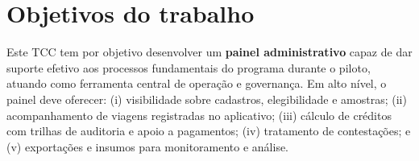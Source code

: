 
\section{Objetivos do trabalho}
Este TCC tem por objetivo desenvolver um \textbf{painel administrativo} capaz
de dar suporte efetivo aos processos fundamentais do programa durante o piloto,
atuando como ferramenta central de operação e governança. Em alto nível, o
painel deve oferecer: (i) visibilidade sobre cadastros, elegibilidade e
amostras; (ii) acompanhamento de viagens registradas no aplicativo; (iii)
cálculo de créditos com trilhas de auditoria e apoio a pagamentos; (iv)
tratamento de contestações; e (v) exportações e insumos para monitoramento e
análise.


